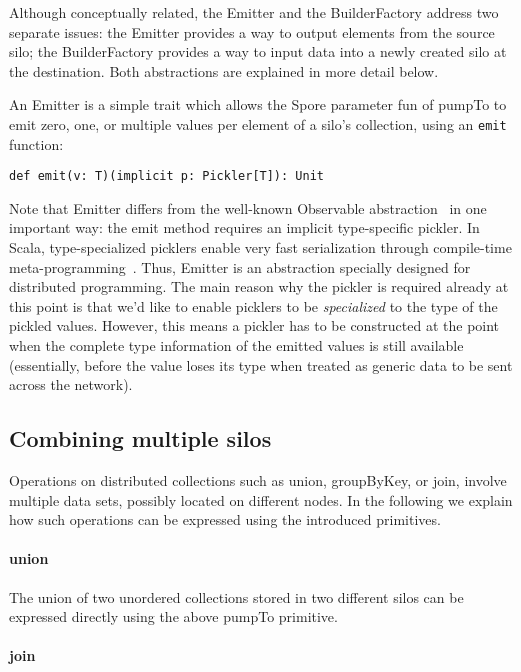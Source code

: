 \documentclass{easychair}
\begin{document}
Although conceptually related, the Emitter and the BuilderFactory address two
separate issues: the Emitter provides a way to output elements from the source
silo; the BuilderFactory provides a way to input data into a newly created
silo at the destination. Both abstractions are explained in more detail below.

An Emitter is a simple trait which allows the Spore parameter fun of pumpTo to
emit zero, one, or multiple values per element of a silo's collection, using an
\verb|emit| function:
\begin{verbatim}
def emit(v: T)(implicit p: Pickler[T]): Unit
\end{verbatim}
\noindent
Note that Emitter differs from the well-known Observable abstraction~\cite{Meijer12}
in one important way: the emit method requires an implicit type-specific
pickler. In Scala, type-specialized picklers enable very fast serialization
through compile-time meta-programming~\cite{MillerHBO13}. Thus, Emitter is an
abstraction specially designed for distributed programming. The main reason
why the pickler is required already at this point is that we'd like to enable
picklers to be \emph{specialized} to the type of the pickled values. However,
this means a pickler has to be constructed at the point when the complete type
information of the emitted values is still available (essentially, before the
value loses its type when treated as generic data to be sent across the
network).

\subsection{Combining multiple silos}

Operations on distributed collections such as union, groupByKey, or join,
involve multiple data sets, possibly located on different nodes. In the
following we explain how such operations can be expressed using the introduced
primitives.

\paragraph{union}

The union of two unordered collections stored in two different silos can be
expressed directly using the above pumpTo primitive.

\paragraph{join}
\end{document}
